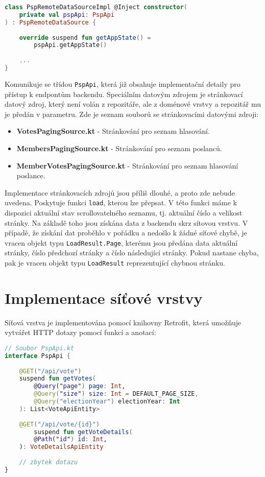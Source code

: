 \newpage

\begin{lstlisting}[caption={Ukázka datového zdroje}, label={lst:data-source}, tabsize=2, language=Kotlin]
class PspRemoteDataSourceImpl @Inject constructor(
	private val pspApi: PspApi
) : PspRemoteDataSource {
	
	override suspend fun getAppState() = 
		pspApi.getAppState()
		
	...
}
\end{lstlisting}

\noindent Komunikuje se třídou \lstinline|PspApi|, která již obsahuje implementační detaily pro přístup k endpontům backendu. Speciálním datovým zdrojem je stránkovací datový zdroj, který není volán z repozitáře, ale z doménové vrstvy a repozitář mu je předán v parametru. Zde je seznam souborů se stránkovacími datovými zdroji:

\begin{itemize}
	\item \textbf{VotesPagingSource.kt} - Stránkování pro seznam hlasování.
	\item \textbf{MembersPagingSource.kt} - Stránkování pro seznam poslanců.
	\item \textbf{MemberVotesPagingSource.kt} - Stránkování pro seznam hlasování poslance.
\end{itemize}

\noindent Implementace stránkovacích zdrojů jsou příliš dlouhé, a proto zde nebude uvedena. Poskytuje funkci \lstinline|load|, kterou lze přepsat. V této funkci máme k dispozici aktuální stav scrollovatelného seznamu, tj. aktuální číslo a velikost stránky. Na základě toho jsou získána data z backendu skrz sítovou vrstvu. V případě, že získání dat proběhlo v pořádku a nedošlo k žádné síťové chybě, je vracen objekt typu \lstinline|LoadResult.Page|, kterému jsou předána data aktuální stránky, číslo předchozí stránky a číslo následující stránky. Pokud nastane chyba, pak je vracen objekt typu \lstinline|LoadResult| reprezentující chybnou stránku.

\section{Implementace síťové vrstvy}
\label{sec:impl-network}

\noindent Síťová vrstva je implementována pomocí knihovny Retrofit, která umožňuje vytvářet HTTP dotazy pomocí funkcí a anotací:

\begin{lstlisting}[caption={Ukázka použití knihovny Retrofit pro získání seznamu hlasování z backendu}, label={lst:retrofit-votes}, tabsize=2, language=Kotlin]
// Soubor PspApi.kt
interface PspApi {
	
	@GET("/api/vote")
	suspend fun getVotes(
		@Query("page") page: Int,
		@Query("size") size: Int = DEFAULT_PAGE_SIZE,
		@Query("electionYear") electionYear: Int
	): List<VoteApiEntity>
	
	@GET("/api/vote/{id}")
		suspend fun getVoteDetails(
		@Path("id") id: Int,
	): VoteDetailsApiEntity
	
	// zbytek dotazu
}
\end{lstlisting}


